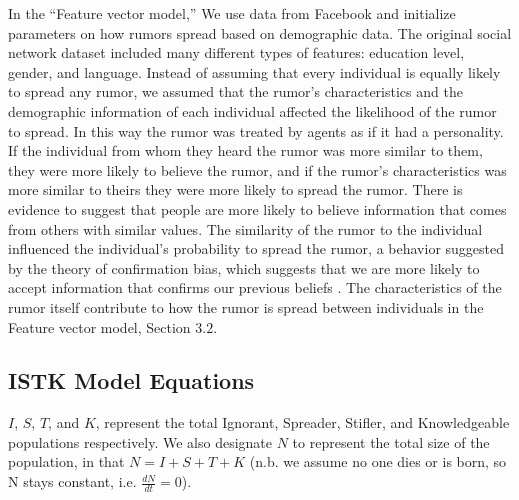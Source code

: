 In the ``Feature vector model,'' We use data from Facebook and initialize parameters on how rumors spread based on demographic data.
The original social network dataset included many different types of features: education level, gender, and language.
Instead of assuming that every individual is equally likely to spread any rumor, we assumed that the rumor's characteristics and the demographic information of each individual affected the likelihood of the rumor to spread.
In this way the rumor was treated by agents as if it had a personality.
If the individual from whom they heard the rumor was more similar to them, they were more likely to believe the rumor, and if the rumor's characteristics was more similar to theirs they were more likely to spread the rumor.
There is evidence to suggest that people are more likely to believe information that comes from others with similar values\cite{gillespie-2004}.
The similarity of the rumor to the individual influenced the individual's probability to spread the rumor, a behavior suggested by the theory of confirmation bias, which suggests that we are more likely to accept information that confirms our previous beliefs \cite{wason-1960}.
The characteristics of the rumor itself contribute to how the rumor is spread between individuals in the Feature vector model, Section $3.2$.

\subsection{ISTK Model Equations}
\label{subsec:istkeqns}


\noindent $ I $, $ S $, $ T $, and $ K $, represent the total Ignorant, Spreader, Stifler, and Knowledgeable populations respectively.
We also designate $ N $ to represent the total size of the population, in that $ N = I + S + T + K $ (n.b. we assume no one dies or is born, so N stays constant, i.e. $\frac{dN}{dt} = 0$).

